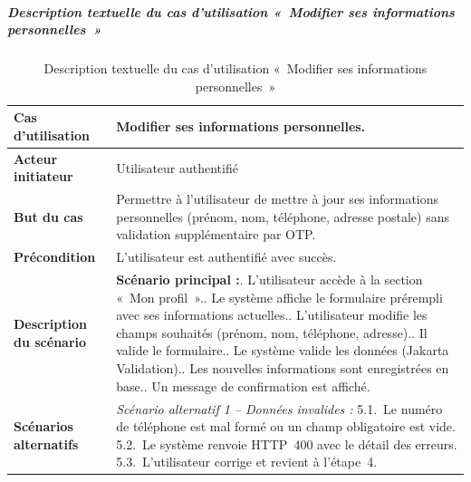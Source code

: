 \subparagraph{Description textuelle du cas d'utilisation «~Modifier ses informations personnelles~»}

\begin{table}[H]
  \caption{Description textuelle du cas d'utilisation «~Modifier ses informations personnelles~»}
  \label{tab:cu-modifier-infos}
  \centering
  \begin{tabularx}{\textwidth}{|L{3.8cm}|X|}
    \hline
    \textbf{Cas d'utilisation} & Modifier ses informations personnelles. \\
    \hline
    \textbf{Acteur initiateur} & Utilisateur authentifié \\
    \hline
    \textbf{But du cas} & Permettre à l'utilisateur de mettre à jour ses informations personnelles (prénom, nom, téléphone, adresse postale) sans validation supplémentaire par OTP. \\
    \hline
    \textbf{Précondition} & L'utilisateur est authentifié avec succès. \\
    \hline
    \textbf{Description du scénario} &
    \textbf{Scénario principal :}. L'utilisateur accède à la section «~Mon profil~».. Le système affiche le formulaire prérempli avec ses informations actuelles.. L'utilisateur modifie les champs souhaités (prénom, nom, téléphone, adresse).. Il valide le formulaire.. Le système valide les données (Jakarta Validation).. Les nouvelles informations sont enregistrées en base.. Un message de confirmation est affiché.\\
    \hline
    \textbf{Scénarios alternatifs} &
    \textit{Scénario alternatif 1 -- Données invalides :}\newline
    \hspace*{6pt}5.1.~Le numéro de téléphone est mal formé ou un champ obligatoire est vide.\newline
    \hspace*{6pt}5.2.~Le système renvoie HTTP~400 avec le détail des erreurs.\newline
    \hspace*{6pt}5.3.~L'utilisateur corrige et revient à l'étape~4.\\
    \hline
  \end{tabularx}
\end{table}

